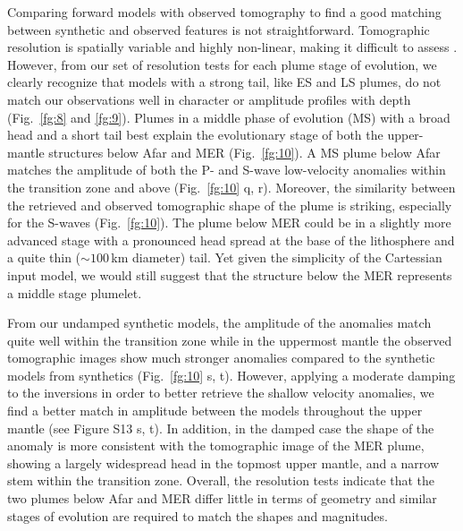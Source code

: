 \documentclass[a4paper,10pt,twocolumn]{paper}
\begin{document}
Comparing forward models with observed tomography to find a good matching between synthetic and observed features is not straightforward. Tomographic resolution is spatially variable and highly non-linear, making it difficult to assess \citep{rawlinson-etal-2010}. However, from our set of resolution tests for each plume stage of evolution, we clearly recognize that models with a strong tail, like ES and LS plumes, do not match our observations well in character or amplitude profiles with depth (Fig.~\ref{fg:8} and \ref{fg:9}).  Plumes in a middle phase of evolution (MS) with a broad head and a short tail best explain the evolutionary stage of both the upper-mantle structures below Afar and MER (Fig.~\ref{fg:10}). A MS plume below Afar matches the amplitude of both the P- and S-wave low-velocity anomalies within the transition zone and above (Fig.~\ref{fg:10} q, r). Moreover, the similarity between the retrieved and observed tomographic shape of the plume is striking, especially for the S-waves (Fig.~\ref{fg:10}). The plume below MER could be in a slightly more advanced stage with a pronounced head spread at the base of the lithosphere and a quite thin ($\sim 100$\,km diameter) tail. Yet given the simplicity of the Cartessian input model, we would still suggest that the structure below the MER represents a middle stage plumelet.

From our undamped synthetic models, the amplitude of the anomalies match quite well within the transition zone while in the uppermost mantle the observed tomographic images show much stronger anomalies compared to the synthetic models from synthetics (Fig.~\ref{fg:10} s, t). However, applying a moderate damping to the inversions in order to better retrieve the shallow velocity anomalies, we find a better match in amplitude between the models throughout the upper mantle (see Figure S13 s, t). In addition, in the damped case the shape of the anomaly is more consistent with the tomographic image of the MER plume, showing a largely widespread head in the topmost upper mantle, and a narrow stem within the transition zone. Overall, the resolution tests indicate that the two plumes below Afar and MER differ little in terms of geometry and similar stages of evolution are required to match the shapes and magnitudes.
\end{document}
